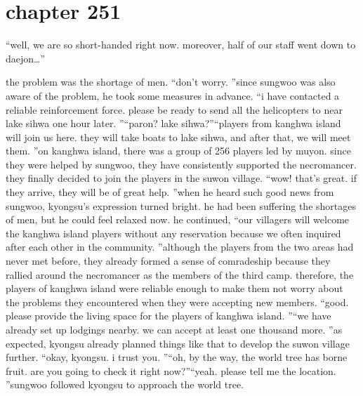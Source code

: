 \section{chapter 251}

                            “well, we are so short-handed right now.
 moreover, half of our staff went down to daejon…”




the problem was the shortage of men.
“don’t worry.
”since sungwoo was also aware of the problem, he took some measures in advance.
“i have contacted a reliable reinforcement force.
 please be ready to send all the helicopters to near lake sihwa one hour later.
”“paron? lake sihwa?”“players from kanghwa island will join us here.
 they will take boats to lake sihwa, and after that, we will meet them.
”on kanghwa island, there was a group of 256 players led by muyon.
since they were helped by sungwoo, they have consistently supported the necromancer.
 they finally decided to join the players in the suwon village.
“wow! that’s great.
 if they arrive, they will be of great help.
”when he heard such good news from sungwoo, kyongsu’s expression turned bright.
 he had been suffering the shortages of men, but he could feel relaxed now.
he continued, “our villagers will welcome the kanghwa island players without any reservation because we often inquired after each other in the community.
”although the players from the two areas had never met before, they already formed a sense of comradeship because they rallied around the necromancer as the members of the third camp.
therefore, the players of kanghwa island were reliable enough to make them not worry about the problems they encountered when they were accepting new members.
“good.
 please provide the living space for the players of kanghwa island.
”“we have already set up lodgings nearby.
 we can accept at least one thousand more.
”as expected, kyongsu already planned things like that to develop the suwon village further.
“okay, kyongsu.
 i trust you.
”“oh, by the way, the world tree has borne fruit.
 are you going to check it right now?”“yeah.
 please tell me the location.
”sungwoo followed kyongsu to approach the world tree.

